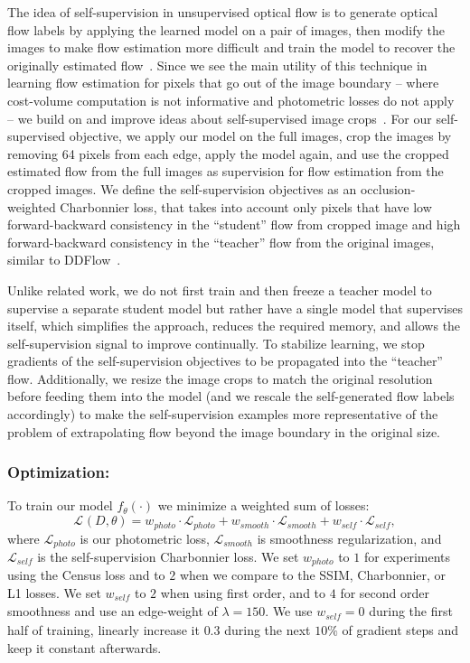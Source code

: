 \documentclass[runningheads]{llncs}
\newcommand{\lossfun}[1]{\mathcal{L}_\mathit{#1}}
\begin{document}
 The idea of self-supervision in unsupervised optical flow is to generate optical flow labels by applying the learned model on a pair of images, then modify the images to make flow estimation more difficult and train the model to recover the originally estimated flow~\cite{DDFlow,SelFlow}. Since we see the main utility of this technique in learning flow estimation for pixels that go out of the image boundary -- where cost-volume computation is not informative and photometric losses do not apply -- we build on and improve ideas about self-supervised image crops~\cite{DDFlow}. 
For our self-supervised objective, we apply our model on the full images, crop the images by removing 64 pixels from each edge, apply the model again, and use the cropped estimated flow from the full images as supervision for flow estimation from the cropped images. We define the self-supervision objectives as an occlusion-weighted Charbonnier loss, that takes into account only pixels that have low forward-backward consistency in the ``student'' flow from cropped image and high forward-backward consistency in the ``teacher'' flow from the original images, similar to DDFlow~\cite{DDFlow}.

 Unlike related work, we do not first train and then freeze a teacher model to supervise a separate student model but rather have a single model that supervises itself, which simplifies the approach, reduces the required memory, and allows the self-supervision signal to improve continually. To stabilize learning, we stop gradients of the self-supervision objectives to be propagated into the ``teacher'' flow. Additionally, we resize the image crops to match the original resolution before feeding them into the model (and we rescale the self-generated flow labels accordingly) to make the self-supervision examples more representative of the problem of extrapolating flow beyond the image boundary in the original size.

\subsubsection{Optimization:}

To train our model $f_\theta(\cdot)$ we minimize a weighted sum of losses:
\begin{equation}
\lossfun{}(D, \theta) = w_{\mathit{photo}} \cdot \lossfun{photo} + w_{\mathit{smooth}} \cdot \lossfun{smooth} + w_{\mathit{self}} \cdot \lossfun{self},
\end{equation}
where $\lossfun{photo}$ is our photometric loss, $\lossfun{smooth}$ is smoothness regularization, and $\lossfun{self}$ is the self-supervision Charbonnier loss. 
We set $w_{\mathit{photo}}$ to $1$ for experiments using the Census loss and to $2$ when we compare to the SSIM, Charbonnier, or L1 losses. We set $w_{\mathit{self}}$ to $2$ when using first order, and to $4$ for second order smoothness and use an edge-weight of $\lambda=150$. We use $w_{\mathit{self}}=0$ during the first half of training, linearly increase it $0.3$ during the next $10\%$ of gradient steps and keep it constant afterwards.
\end{document}
